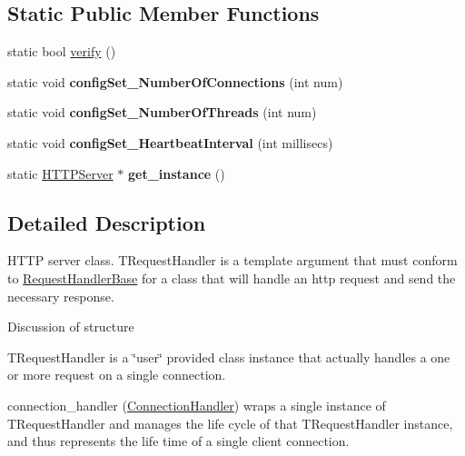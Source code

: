 \subsection*{Static Public Member Functions}
\begin{DoxyCompactItemize}
\item 
static bool \hyperlink{class_h_t_t_p_server_a903d110951861510bd885333ee22fb6c}{verify} ()
\item 
\mbox{\label{class_h_t_t_p_server_acd4c031485802323ff872b76860413bf}} 
static void {\bfseries config\+Set\+\_\+\+Number\+Of\+Connections} (int num)
\item 
\mbox{\label{class_h_t_t_p_server_adcf739f3cd5e055c0155ec6bc3cd9cc6}} 
static void {\bfseries config\+Set\+\_\+\+Number\+Of\+Threads} (int num)
\item 
\mbox{\label{class_h_t_t_p_server_ab9f39cb7b348bb1bcd3a671bd2706b57}} 
static void {\bfseries config\+Set\+\_\+\+Heartbeat\+Interval} (int millisecs)
\item 
\mbox{\label{class_h_t_t_p_server_a77afcf8dc54df4a24cdf7a1bd2d29aaf}} 
static \hyperlink{class_h_t_t_p_server}{H\+T\+T\+P\+Server} $\ast$ {\bfseries get\+\_\+instance} ()
\end{DoxyCompactItemize}


\subsection{Detailed Description}
H\+T\+TP server class.  T\+Request\+Handler is a template argument that must conform to \hyperlink{class_request_handler_base}{Request\+Handler\+Base} for a class that will handle an http request and send the necessary response. 

Discussion of structure

T\+Request\+Handler is a \char`\"{}user\char`\"{} provided class instance that actually handles a one or more request on a single connection.

connection\+\_\+handler (\hyperlink{class_connection_handler}{Connection\+Handler}) wraps a single instance of T\+Request\+Handler and manages the life cycle of that T\+Request\+Handler instance, and thus represents the life time of a single client connection.


